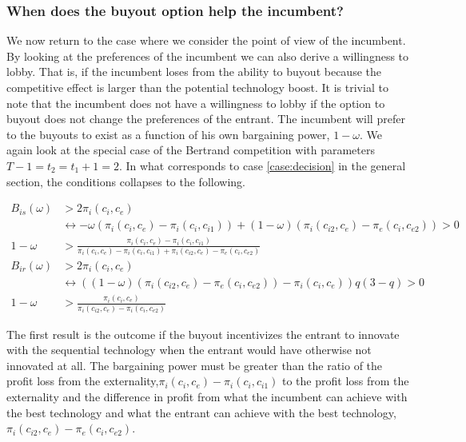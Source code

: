 \subsubsection{When does the buyout option help the incumbent?}

We now return to the case where we consider the point of view of the incumbent. By looking at the preferences of the incumbent we can also derive a willingness to lobby. That is, if the incumbent loses from the ability to buyout because the competitive effect is larger than the potential technology boost. It is trivial to note that the incumbent does not have a willingness to lobby if the option to buyout does not change the preferences of the entrant. The incumbent will prefer to the buyouts to exist as a function of his own bargaining power, $1-\omega$. We again look at the special case of the Bertrand competition with parameters $T-1=t_2=t_1+1=2$. In what corresponds to case \ref{case:decision} in the general section, the conditions collapses to the following. 

\begin{align*}
B_{is}(\omega)&>2 \pi_i(c_i,c_e) \\
& \leftrightarrow -\omega(\pi_i(c_i,c_{e})- \pi_i(c_i,c_{i1})) 
+(1-\omega)(\pi_i(c_{i2},c_e)-\pi_e(c_{i},c_{e2})) >0 \\
1-\omega &> \frac{\pi_i(c_i,c_{e})- \pi_i(c_i,c_{i1})}{\pi_i(c_i,c_{e})- \pi_i(c_i,c_{i1})+\pi_i(c_{i2},c_e)-\pi_e(c_{i},c_{e2})}
\\
B_{ir}(\omega)&>2 \pi_i(c_i,c_e) \\
& \leftrightarrow ((1-\omega)(\pi_{i}(c_{i2},c_{e})-\pi_{e}(c_{i},c_{e2}))-\pi_i(c_i,c_e)) q(3-q)>0 \\
1-\omega&>\frac{\pi_i(c_i,c_e)}{\pi_i(c_{i2},c_e)-\pi_i(c_{i},c_{e2})}
\end{align*}

The first result is the outcome if the buyout incentivizes the entrant to innovate with the sequential technology when the entrant would have otherwise not innovated at all. The bargaining power must be greater than the ratio of the profit loss from the externality,$\pi_i(c_i,c_{e})- \pi_i(c_i,c_{i1})$ to the profit loss from the externality and the difference in profit from what the incumbent can achieve with the best technology and what the entrant can achieve with the best technology,$\pi_i(c_{i2},c_e)-\pi_e(c_{i},c_{e2})$. 

